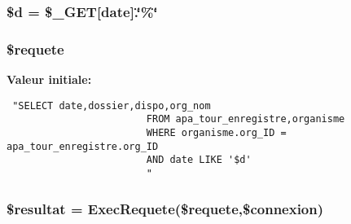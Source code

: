 \hypertarget{imprime__dass_8php_a1}{
\subsubsection[\$d]{\setlength{\rightskip}{0pt plus 5cm}\$d = \$\_\-GET\mbox{[}date\mbox{]}.\char`\"{}\%\char`\"{}}}
\label{imprime__dass_8php_a1}


\hypertarget{imprime__dass_8php_a2}{
\subsubsection[\$requete]{\setlength{\rightskip}{0pt plus 5cm}\$requete}}
\label{imprime__dass_8php_a2}


{\bf Valeur initiale:}

\footnotesize\begin{verbatim} "SELECT date,dossier,dispo,org_nom
                        FROM apa_tour_enregistre,organisme
                        WHERE organisme.org_ID = apa_tour_enregistre.org_ID
                        AND date LIKE '$d'
                        "
\end{verbatim}\normalsize 
\hypertarget{imprime__dass_8php_a3}{
\subsubsection[\$resultat]{\setlength{\rightskip}{0pt plus 5cm}\$resultat = Exec\-Requete(\$requete,\$connexion)}}
\label{imprime__dass_8php_a3}


